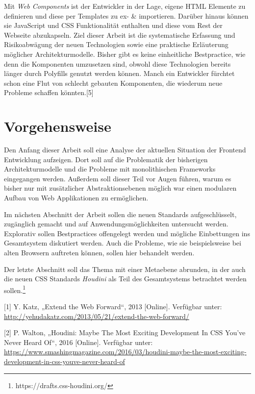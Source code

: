 \documentclass[ngerman,]{assets/latex/ieee}
\begin{document}
Mit \emph{Web Components} ist der Entwickler in der Lage, eigene HTML
Elemente zu definieren und diese per Templates zu ex- \& importieren.
Darüber hinaus können sie JavaScript und CSS Funktionalität enthalten
und diese vom Rest der Webseite abzukapseln. Ziel dieser Arbeit ist die
systematische Erfassung und Risikoabwägung der neuen Technologien sowie
eine praktische Erläuterung möglicher Architekturmodelle. Bisher gibt es
keine einheitliche Bestpractice, wie denn die Komponenten umzusetzen
sind, obwohl diese Technologien bereits länger durch Polyfills genutzt
werden können. Manch ein Entwickler fürchtet schon eine Flut von
schlecht gebauten Komponenten, die wiederum neue Probleme schaffen
könnten.{[}5{]}

\section{Vorgehensweise}\label{vorgehensweise}

Den Anfang dieser Arbeit soll eine Analyse der aktuellen Situation der
Frontend Entwicklung aufzeigen. Dort soll auf die Problematik der
bisherigen Architekturmodelle und die Probleme mit monolithischen
Frameworks eingegangen werden. Außerdem soll dieser Teil vor Augen
führen, warum es bisher nur mit zusätzlicher Abstraktionsebenen möglich
war einen modularen Aufbau von Web Applikationen zu ermöglichen.

Im nächsten Abschnitt der Arbeit sollen die neuen Standards
aufgeschlüsselt, zugänglich gemacht und auf Anwendungsmöglichkeiten
untersucht werden. Explorativ sollen Bestpractices offengelegt werden
und mögliche Einbettungen ins Gesamtsystem diskutiert werden. Auch die
Probleme, wie sie beispielsweise bei alten Browsern auftreten können,
sollen hier behandelt werden.

Der letzte Abschnitt soll das Thema mit einer Metaebene abrunden, in der
auch die neuen CSS Standards \emph{Houdini} als Teil des Gesamtsystems
betrachtet werden sollen.\footnote{https://drafts.css-houdini.org/}

\hypertarget{refs}{}
\hypertarget{ref-Katz2013}{}
{[}1{]} Y. Katz, „Extend the Web Forward``, 2013 {[}Online{]}. Verfügbar
unter: \url{http://yehudakatz.com/2013/05/21/extend-the-web-forward/}

\hypertarget{ref-Walton2016}{}
{[}2{]} P. Walton, „Houdini: Maybe The Most Exciting Development In CSS
You've Never Heard Of``, 2016 {[}Online{]}. Verfügbar unter:
\url{https://www.smashingmagazine.com/2016/03/houdini-maybe-the-most-exciting-development-in-css-youve-never-heard-of}
\end{document}
